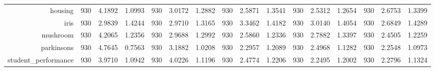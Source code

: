 \begin{table}[htbp]
{\begin{tabular}{rccccccccccccccc}
                  housing                             & 930                                      & 4.1892                                                                    & 1.0993          & 930                            & 3.0172          & 1.2882          & 930                             & 2.5871          & 1.3541          & 930                             & \cellcolor[rgb]{ .776,  .937,  .808}\textcolor[rgb]{ 0,  .38,  0}{2.5312} & 1.2654          & 930                             & 2.6753                                                                             & 1.3399          \\
                  iris                                & 930                                      & 2.9839                                                                    & 1.4244          & 930                            & 2.9710          & 1.3165          & 930                             & 3.3462          & 1.4182          & 930                             & 3.0140                                                                    & 1.4054          & 930                             & \cellcolor[rgb]{ .776,  .937,  .808}\textcolor[rgb]{ 0,  .38,  0}{2.6849}          & 1.4289          \\
                  mushroom                            & 930                                      & 4.2065                                                                    & 1.2356          & 930                            & 2.9688          & 1.2992          & 930                             & 2.5860          & 1.2336          & 930                             & 2.7882                                                                    & 1.3397          & 930                             & \cellcolor[rgb]{ .776,  .937,  .808}\textcolor[rgb]{ 0,  .38,  0}{2.4505}          & 1.2259          \\
                  parkinsons                          & 930                                      & 4.7645                                                                    & 0.7563          & 930                            & 3.1882          & 1.0208          & 930                             & 2.2957          & 1.2089          & 930                             & 2.4968                                                                    & 1.1282          & 930                             & \cellcolor[rgb]{ .776,  .937,  .808}\textcolor[rgb]{ 0,  .38,  0}{2.2548}          & 1.0973          \\
                  student\_performance                & 930                                      & 3.9710                                                                    & 1.0942          & 930                            & 4.0226          & 1.1196          & 930                             & 2.4774          & 1.2206          & 930                             & \cellcolor[rgb]{ .776,  .937,  .808}\textcolor[rgb]{ 0,  .38,  0}{2.2495} & 1.2002          & 930                             & 2.2796                                                                             & 1.1324          \\

\end{tabular}}
\end{table}
